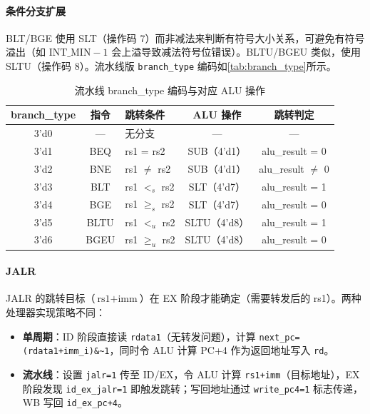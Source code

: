 \documentclass[12pt,hyperref,a4paper,UTF8]{ctexart}
\begin{document}
\paragraph{条件分支扩展}

BLT/BGE 使用 SLT（操作码 7）而非减法来判断有符号大小关系，可避免有符号溢出（如 $\text{INT\_MIN} - 1$ 会上溢导致减法符号位错误）。BLTU/BGEU 类似，使用 SLTU（操作码 8）。流水线版 \texttt{branch\_type} 编码如\autoref{tab:branch_type}所示。

\begin{table}[H]
    \centering
    \caption{流水线 branch\_type 编码与对应 ALU 操作}
    \label{tab:branch_type}
    \begin{tabular}{cclcc}
        \toprule
        branch\_type & 指令 & 跳转条件 & ALU 操作 & 跳转判定 \\
        \midrule
        3'd0 & — & 无分支 & — & — \\
        3'd1 & BEQ  & rs1 = rs2 & SUB（4'd1） & alu\_result = 0 \\
        3'd2 & BNE  & rs1 $\neq$ rs2 & SUB（4'd1） & alu\_result $\neq$ 0 \\
        3'd3 & BLT  & rs1 $<_s$ rs2 & SLT（4'd7） & alu\_result = 1 \\
        3'd4 & BGE  & rs1 $\geq_s$ rs2 & SLT（4'd7） & alu\_result = 0 \\
        3'd5 & BLTU & rs1 $<_u$ rs2 & SLTU（4'd8） & alu\_result = 1 \\
        3'd6 & BGEU & rs1 $\geq_u$ rs2 & SLTU（4'd8） & alu\_result = 0 \\
        \bottomrule
    \end{tabular}
\end{table}

\paragraph{JALR}

JALR 的跳转目标（$\text{rs1}+\text{imm}$）在 EX 阶段才能确定（需要转发后的 rs1）。两种处理器实现策略不同：
\begin{itemize}[leftmargin=2em]
    \item \textbf{单周期}：ID 阶段直接读 \texttt{rdata1}（无转发问题），计算 \texttt{next\_pc=(rdata1+imm\_i)\&\textasciitilde 1}，同时令 ALU 计算 PC+4 作为返回地址写入 \texttt{rd}。
    \item \textbf{流水线}：设置 \texttt{jalr=1} 传至 ID/EX，令 ALU 计算 \texttt{rs1+imm}（目标地址），EX 阶段发现 \texttt{id\_ex\_jalr=1} 即触发跳转；写回地址通过 \texttt{write\_pc4=1} 标志传递，WB 写回 \texttt{id\_ex\_pc+4}。
\end{itemize}
\end{document}
